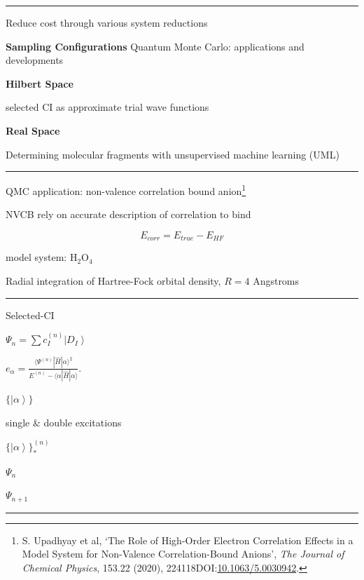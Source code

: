 \documentclass[
  letterpaper,
  DIV=11,
  numbers=noendperiod]{scrartcl}
\begin{document}
\begin{center}\rule{0.5\linewidth}{0.5pt}\end{center}

Reduce cost through various system reductions

\textbf{Sampling Configurations} Quantum Monte Carlo: applications and
developments

\textbf{Hilbert Space}

selected CI as approximate trial wave functions

\textbf{Real Space}

Determining molecular fragments with unsupervised machine learning (UML)

\begin{center}\rule{0.5\linewidth}{0.5pt}\end{center}

\leavevmode{}%
QMC application:{ non-valence correlation bound anion\footnote{S.
  Upadhyay et al, {`The Role of High-Order Electron Correlation Effects
  in a Model System for Non-Valence Correlation-Bound Anions'},
  \emph{The Journal of Chemical Physics}, 153.22 (2020),
  224118DOI:\href{https://doi.org/10.1063/5.0030942}{10.1063/5.0030942}.}}

NVCB rely on accurate description of correlation to bind

\[E_{corr} = E_{true}-E_{HF}\]

model system: H\(_2\)O\(_4\)

Radial integration of Hartree-Fock orbital density, \(R=4\) Angstroms

\begin{center}\rule{0.5\linewidth}{0.5pt}\end{center}

Selected-CI

\(\Psi_n = \sum c_I^{(n)}\left|D_I\right>\)

\(e_\alpha = \frac{ \langle \Psi^{(n)}| {\hat H} | \alpha \rangle^2 }{E^{(n)} - \langle \alpha | {\hat H} | \alpha \rangle }.\)

\(\{ \left|\alpha\right> \}\)

single \& double excitations

\(\{ \left|\alpha\right> \}_*^{(n)}\)

\(\Psi_n\)

\(\Psi_{n+1}\)

\begin{center}\rule{0.5\linewidth}{0.5pt}\end{center}
\end{document}
